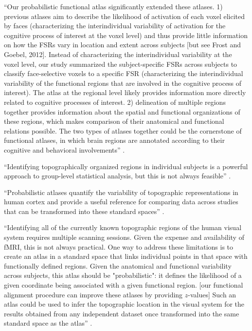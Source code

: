 ``Our probabilistic functional atlas significantly extended these atlases.
%
1) previous atlases aim to describe the likelihood of activation of each voxel
elicited by faces (characterizing the interindividual variability of activation
for the cognitive process of interest at the voxel level) and thus provide
little information on how the FSRs vary in location and extent across subjects
[but see Frost and Goebel, 2012].
%
Instead of characterizing the interindividual variability at the voxel level,
our study summarized the subject-specific FSRs across subjects to classify
face-selective voxels to a specific FSR (characterizing the interindividual
variability of the functional regions that are involved in the cognitive process
of interest).
%
The atlas at the regional level likely provides information more directly
related to cognitive processes of interest.
%
2) delineation of multiple regions together provides information about the
spatial and functional organizations of these regions, which makes comparison of
their anatomical and functional relations possible.
%
The two types of atlases together could be the cornerstone of functional
atlases, in which brain regions are annotated according to their cognitive and
behavioral involvements'' \citep{zhen2015quantifying}.








``Identifying topographically organized regions in individual subjects
is a powerful approach to group-level statistical analysis, but this is not
always feasible'' \citep{wang2015probabilistic}.

``Probabilistic atlases quantify the variability of topographic
representations in human cortex and provide a useful reference for comparing
data across studies that can be transformed into these standard spaces''
\citep{wang2015probabilistic}.

``Identifying all of the currently known topographic regions of the human visual
system requires multiple scanning sessions.
%
Given the expense and availability of fMRI, this is not always practical.
%
One way to address these limitations is to create an atlas in a standard space
that links individual points in that space with functionally defined regions.
%
Given the anatomical and functional variability across subjects, this atlas
should be "probabilistic": it defines the likelihood of a given coordinate being
associated with a given functional region. [our functional alignment procedure
can improve these atlases by providing $z$-values]
%
Such an atlas could be used to infer the topographic location in the visual
system for the results obtained from any independent dataset once transformed
into the same standard space as the atlas'' \citep{wang2015probabilistic}.

